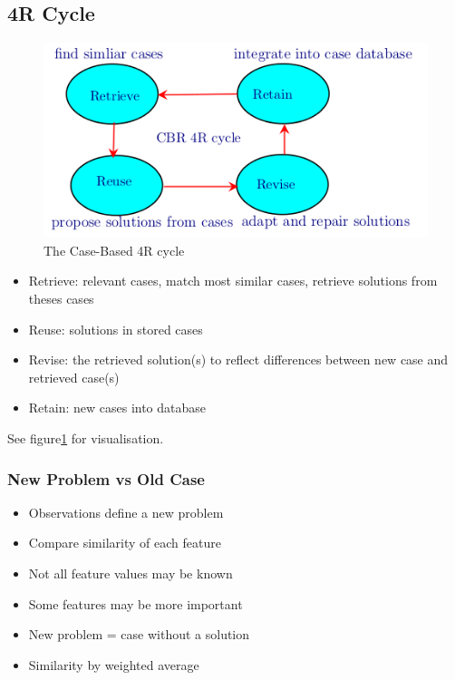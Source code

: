 \subsection{4R Cycle}

\begin{figure}[h]
\includegraphics[scale=1]{chap7_pics/case-base-4rcycle.png} 
\caption{The Case-Based 4R cycle}
\label{case-base_4rcycle}
\end{figure}

\begin{itemize}
\item Retrieve: relevant cases, match most similar cases, retrieve solutions from theses cases
\item Reuse: solutions in stored cases
\item Revise: the retrieved solution(s) to reflect differences between new case and retrieved case(s)
\item Retain: new cases into database
\end{itemize}

See figure\ref{case-base_4rcycle} for visualisation.

\subsubsection{New Problem vs Old Case}
\begin{itemize}
\item Observations define a new problem
\item Compare similarity of each feature
\item Not all feature values may be known
\item Some features may be more important
\item New problem = case without a solution
\item Similarity by weighted average
\end{itemize}

